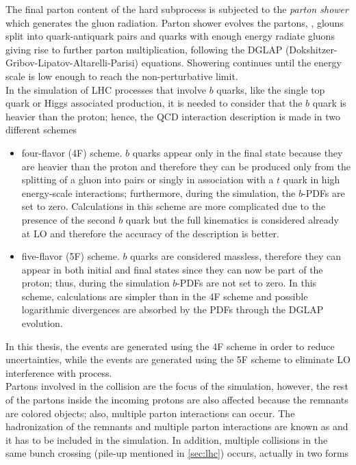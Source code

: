 \noindent The final parton content of the hard subprocess is subjected to the \textit{parton shower} which generates the gluon radiation. Parton shower evolves the partons, \ie, glouns split into quark-antiquark pairs and quarks with enough energy radiate gluons giving rise to further parton multiplication, following the DGLAP (Dokshitzer-Gribov-Lipatov-Altarelli-Parisi) equations. Showering continues until the energy scale is low enough to reach the non-perturbative limit.\\   

\noindent In the simulation of LHC processes that involve $b$ quarks, like the single top quark or Higgs associated production, it is needed to consider that the $b$ quark is heavier than the proton; hence, the QCD interaction description is made in two different schemes \cite{schemes}

\begin{itemize}

\item four-flavor (4F) scheme. $b$ quarks appear only in the final state because they are heavier than the proton and therefore they can be produced only from the splitting of a gluon into pairs or singly in association with a $t$ quark in high energy-scale interactions; furthermore, during the simulation, the $b$-PDFs are set to zero. Calculations in this scheme are more complicated due to the presence of the second $b$ quark but the full kinematics is considered already at LO and therefore the accuracy of the description is better.   

\item five-flavor (5F) scheme. $b$ quarks are considered massless, therefore they can appear in both initial and final states since they can now be part of the proton; thus, during the simulation $b$-PDFs are not set to zero. In this scheme, calculations are simpler than in the 4F scheme and possible logarithmic divergences are absorbed by the PDFs through the DGLAP evolution.   
\end{itemize}

\noindent In this thesis, the \tHq events are generated using the 4F scheme in order to reduce uncertainties, while the \tHW events are generated using the 5F scheme to eliminate LO interference with \ttH process\cite{demartin}.\\    

\noindent Partons involved in the \pp collision are the focus of the simulation, however, the rest of the partons inside the incoming protons are also affected because the remnants are colored objects; also, multiple parton interactions can occur. The hadronization of the remnants and multiple parton interactions are known as  and it has to be included in the simulation. In addition, multiple \pp collisions in the same bunch crossing (pile-up mentioned in \ref{sec:lhc}) occurs, actually in two forms

